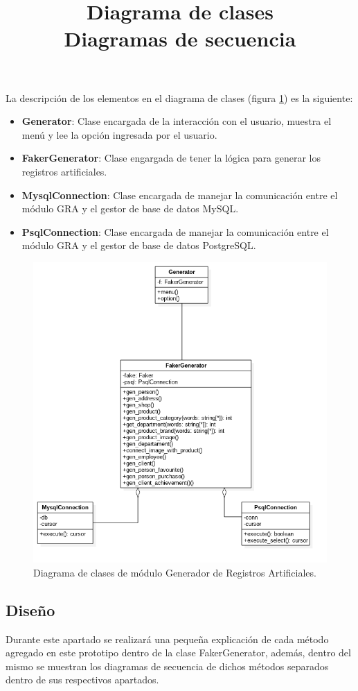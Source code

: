 \title{\textbf{Diagrama de clases}\\}
La descripción de los elementos en el diagrama de clases (figura \ref{image:diagramaclasesGRA11}) es la siguiente: 

\begin{itemize}
\item \textbf{Generator}: Clase encargada de la interacción con el usuario, muestra el menú y lee la opción ingresada por el usuario.
\item \textbf{FakerGenerator}: Clase engargada de tener la lógica para generar los registros artificiales.
\item \textbf{MysqlConnection}: Clase encargada de manejar la comunicación entre el módulo GRA y el gestor de base de datos MySQL.
\item \textbf{PsqlConnection}: Clase encargada de manejar la comunicación entre el módulo GRA y el gestor de base de datos PostgreSQL.
\end{itemize}

\FloatBarrier
\begin{figure}[htbp!]
		\centering
			\includegraphics[width=.7 \textwidth]{imagenes/ClasesRuben/generador11}
		\caption{Diagrama de clases de módulo Generador de Registros Artificiales.}
		\label{image:diagramaclasesGRA11}
\end{figure}
\FloatBarrier

\subsection{Diseño}

\title{\textbf{Diagramas de secuencia\\}}
Durante este apartado se realizará una pequeña explicación de cada método agregado en este prototipo dentro de la clase FakerGenerator, además, dentro del mismo se muestran los diagramas de secuencia de dichos métodos separados dentro de sus respectivos apartados. \\

